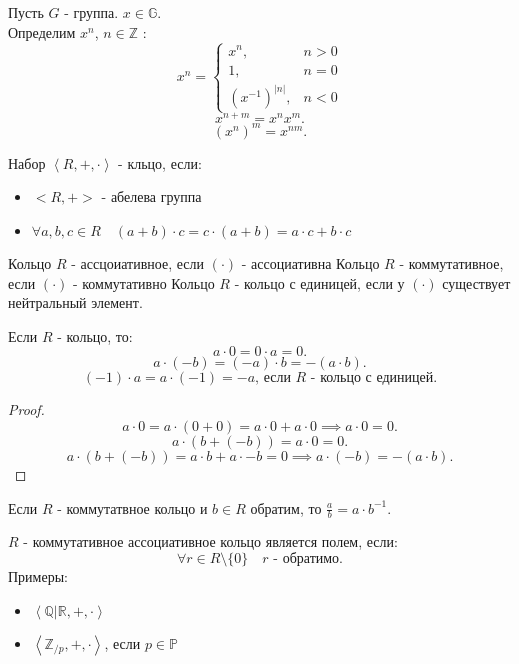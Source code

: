 \documentclass[11pt, oneside]{article}   	%
\begin{document}
\begin{definition}
    Пусть $G$ - группа.  $x\in \mathbb{G}$.\\
    Определим $x^{n}$, $n\in \mathbb{Z}$ :
    \begin{equation*}
        x^{n} = 
        \begin{cases}
            x^{n},& n > 0\\
            1,& n = 0\\
            \left( x^{-1} \right) ^{|n|},&n < 0
        \end{cases}
    \end{equation*}
    \[ x^{n+m} = x^{n}x^{m} .\]
    \[ (x^{n})^{m} = x^{nm} .\] 
\end{definition}
\begin{definition}
    Набор $\left<R, +, \cdot \right>$ - кльцо, если:
    \begin{itemize}
        \item $<R, +>$ - абелева группа\\
        \item  $\forall{a,b,c\in R}\quad (a+b)\cdot c = c\cdot (a+b) = a\cdot c+b\cdot c$
    \end{itemize}
    Кольцо $R$ - ассцоиативное, если $(\cdot)$ - ассоциативна
    Кольцо $R$ - коммутативное, если $(\cdot)$ - коммутативно
    Кольцо $R$ - кольцо с единицей, если у $(\cdot)$ существует нейтральный элемент.
\end{definition}
\begin{dlemma}
    Если $R$ - кольцо, то:
    \[ a\cdot 0 = 0 \cdot a = 0 .\]
    \[ a \cdot (-b) = (-a) \cdot b = -(a\cdot b) .\]
    \[ (-1)\cdot a = a\cdot (-1) = -a\text{, если $R$ - кольцо с единицей} .\]
    \begin{proof}
        \[ a\cdot 0 = a\cdot (0+0) = a\cdot 0 + a\cdot 0 \implies a\cdot 0 = 0 .\]
        \[ a \cdot  \left( b+(-b) \right) = a\cdot 0 =0 .\]
        \[ a \cdot (b+(-b)) = a\cdot b + a \cdot -b = 0 \implies a\cdot (-b) = -(a\cdot b) .\] 
    \end{proof}
\end{dlemma}
\begin{dlemma}
    Если $R$ - коммутатвное кольцо и $b\in R$ обратим, то $\frac{a}{b} = a\cdot b^{-1}$.
\end{dlemma}
\begin{definition}
    $R$ - коммутативное ассоциативное кольцо является полем, если:
    \[ \forall{r\in R\setminus \{0\} }\quad \text{$r$ - обратимо} .\]
    Примеры:
    \begin{itemize}
        \item $\left<\mathbb{Q}|\mathbb{R}, +, \cdot \right>$ 
        \item $\left<\mathbb{Z}_{/p}, +, \cdot \right>$, если $p\in \mathbb{P}$
    \end{itemize}
\end{definition}
\end{document}

